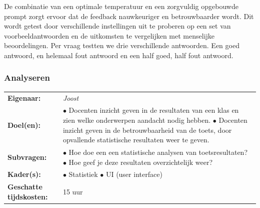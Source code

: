 \documentclass[12pt]{article}
\begin{document}
\noindent De combinatie van een optimale temperatuur en een zorgvuldig opgebouwde prompt zorgt ervoor dat de feedback nauwkeuriger en betrouwbaarder wordt. Dit wordt getest door verschillende instellingen uit te proberen op een set van voorbeeldantwoorden en de uitkomsten te vergelijken met menselijke beoordelingen. Per vraag testten we drie verschillende antwoorden. Een goed antwoord, en helemaal fout antwoord en een half goed, half fout antwoord.


\pagebreak



\subsubsection{Analyseren}
\begin{tabularx}{\linewidth}{@{}ll}
    \textbf{Eigenaar: } & \textit{Joost} \\
    \textbf{Doel(en): } & 
        \makecell[tl]{
            $\bullet$ Docenten inzicht geven in de resultaten van een klas en zien welke \\onderwerpen aandacht nodig hebben.\\
            $\bullet$ Docenten inzicht geven in de betrouwbaarheid van de toets, door opvallende \\ statistische resultaten weer te geven.\\
        } \\
    \textbf{Subvragen: } & 
        \makecell[tl]{
            $\bullet$ Hoe doe een een statistische analysen van toetsresultaten? \\
            $\bullet$ Hoe geef je deze resultaten overzichtelijk weer? \\
        }\\
    \textbf{Kader(s): } & 
        \makecell[tl]{
            $\bullet$ Statistiek \\
            $\bullet$ UI (user interface) \\
        }\\
    \parbox[t]{3cm}{\raggedright \textbf{Geschatte  tijdskosten:} } & 15 uur \\
\end{tabularx}
\\
\end{document}
